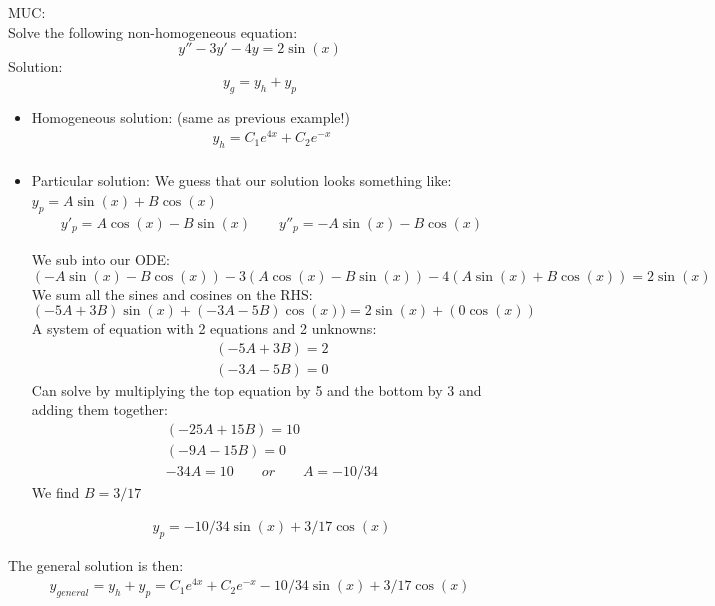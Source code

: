 \begin{exmp}{MUC:}\\
Solve the following non-homogeneous equation:
\begin{equation*}
y''-3y'-4y=2\sin(x)
\end{equation*}
Solution:\\

\begin{equation}
y_{g}=y_{h} + y_{p} 
\end{equation}
\begin{itemize}
\item Homogeneous solution:
(same as previous example!)
\begin{align*}
y_h=C_1 e^{4x}+C_2 e^{-x}\\
\end{align*}
\item Particular solution:
We guess that our solution looks something like: $y_p=A\sin(x)+B\cos(x)$\\
\begin{align*}
y'_p=A\cos(x)-B\sin(x) \qquad  y''_p=-A\sin(x)-B\cos(x)
\end{align*}

We sub into our ODE:
\begin{equation*}
(-A\sin(x)-B\cos(x))-3(A\cos(x)-B\sin(x))-4(A\sin(x)+B\cos(x))=2\sin(x)
\end{equation*}
We sum all the sines and cosines on the RHS:
\begin{equation*}
(-5A+3B)\sin(x)+(-3A-5B)\cos(x))=2\sin(x) + (0\cos(x))
\end{equation*}
A system of equation with 2 equations and 2 unknowns:
\begin{align*}
(-5A+3B)=2\\
(-3A-5B)=0
\end{align*}
Can solve by multiplying the top equation by 5 and the bottom by 3 and adding them together:
\begin{align*}
(-25A+15B)=10\\
(-9A-15B)=0\\
-34A=10 \qquad or \qquad A=-10/34
\end{align*}
We find $B=3/17$

\begin{align*}
y_p=-10/34\sin(x)+3/17\cos(x)
\end{align*}
\end{itemize}
The general solution is then:
\begin{align*}
y_{general}=y_h+y_p=C_1 e^{4x}+C_2 e^{-x} -10/34\sin(x)+3/17\cos(x)
\end{align*}
\end{exmp}



